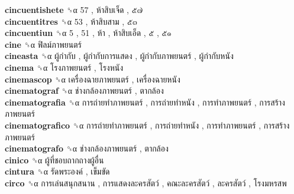 \textbf{cincuentishete} ␝α   57 ,  ห้าสิบเจ็ด ,  ๕๗   \\
\textbf{cincuentitres} ␝α   53 ,  ห้าสิบสาม ,  ๕๓   \\
\textbf{cincuentiun} ␝α   5 ,  51 ,  ห้า ,  ห้าสิบเอ็ด ,  ๕ ,  ๕๑   \\
\textbf{cine} ␝α   ฟิลม์ภาพยนตร์   \\
\textbf{cineasta} ␝α   ผู้กำกับ ,  ผู้กำกับการแสดง ,  ผู้กำกับภาพยนตร์ ,  ผู้กำกับหนัง   \\
\textbf{cinema} ␝α   โรงภาพยนตร์ ,  โรงหนัง   \\
\textbf{cinemascop} ␝α   เครื่องฉายภาพยนตร์ ,  เครื่องฉายหนัง   \\
\textbf{cinematograf} ␝α   ช่างกล้องภาพยนตร์ ,  ตากล้อง   \\
\textbf{cinematografia} ␝α   การถ่ายทำภาพยนตร์ ,  การถ่ายทำหนัง ,  การทำภาพยนตร์ ,  การสร้างภาพยนตร์   \\
\textbf{cinematografico} ␝α   การถ่ายทำภาพยนตร์ ,  การถ่ายทำหนัง ,  การทำภาพยนตร์ ,  การสร้างภาพยนตร์   \\
\textbf{cinematografo} ␝α   ช่างกล้องภาพยนตร์ ,  ตากล้อง   \\
\textbf{cinico} ␝α   ผู้ที่ชอบถากถางผู้อื่น   \\
\textbf{cintura} ␝α   รัดพระองค์ ,  เข็มขัด   \\
\textbf{circo} ␝α   การเล่นสนุกสนาน ,  การแสดงละครสัตว์ ,  คณะละครสัตว์ ,  ละครสัตว์ ,  โรงมหรสพ   \\
